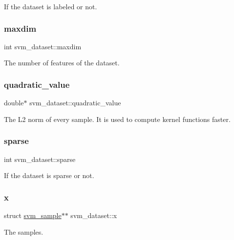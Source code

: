 If the dataset is labeled or not. \hypertarget{structsvm__dataset_aec1d1ee62ef8204fe90d8c6b7a647177}{}\label{structsvm__dataset_aec1d1ee62ef8204fe90d8c6b7a647177} 
\subsubsection{\texorpdfstring{maxdim}{maxdim}}
{\ttfamily int svm\+\_\+dataset\+::maxdim}

The number of features of the dataset. \hypertarget{structsvm__dataset_a4b1ff8b06358c73f6b55ecae7516d01e}{}\label{structsvm__dataset_a4b1ff8b06358c73f6b55ecae7516d01e} 
\subsubsection{\texorpdfstring{quadratic\+\_\+value}{quadratic\_value}}
{\ttfamily double$\ast$ svm\+\_\+dataset\+::quadratic\+\_\+value}

The L2 norm of every sample. It is used to compute kernel functions faster. \hypertarget{structsvm__dataset_a58e8012a38ef5ea1c642db1b8c06b8bc}{}\label{structsvm__dataset_a58e8012a38ef5ea1c642db1b8c06b8bc} 
\subsubsection{\texorpdfstring{sparse}{sparse}}
{\ttfamily int svm\+\_\+dataset\+::sparse}

If the dataset is sparse or not. \hypertarget{structsvm__dataset_ad3e266a07c610ed3f10df1bab30fd9e5}{}\label{structsvm__dataset_ad3e266a07c610ed3f10df1bab30fd9e5} 
\subsubsection{\texorpdfstring{x}{x}}
{\ttfamily struct \hyperlink{structsvm__sample}{svm\+\_\+sample}$\ast$$\ast$ svm\+\_\+dataset\+::x}

The samples. \hypertarget{structsvm__dataset_a2bce5da2f59f28fe18eff3f92f92c011}{}\label{structsvm__dataset_a2bce5da2f59f28fe18eff3f92f92c011} 

